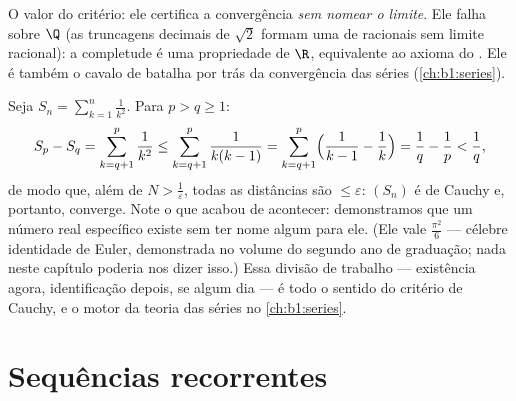 \begin{remark}
O valor do critério: ele certifica a convergência \emph{sem
nomear o limite}. Ele falha sobre $\Q$ (as truncagens decimais de
$\sqrt 2$ formam uma  de racionais sem limite
racional): a completude é uma propriedade de $\R$, equivalente ao
axioma do . Ele é também o cavalo de batalha por trás da
convergência das séries (\cref{ch:b1:series}).
\end{remark}

\begin{example}\label{ex:b1:seq:basel}
Seja $S_n = \sum_{k=1}^{n} \frac{1}{k^2}$. Para $p > q \geq 1$:
\[
S_p - S_q = \sum_{k=q+1}^{p} \frac{1}{k^2}
\leq \sum_{k=q+1}^{p} \frac{1}{k(k-1)}
= \sum_{k=q+1}^{p} \Bigl(\frac{1}{k-1} - \frac 1k\Bigr)
= \frac 1q - \frac 1p < \frac 1q ,
\]
de modo que, além de $N > \frac1\varepsilon$, todas as distâncias são $\leq \varepsilon$:
$(S_n)$ é de Cauchy e, portanto, converge. Note o que acabou de
acontecer: demonstramos que um número real específico existe sem ter
nome algum para ele. (Ele vale $\frac{\pi^2}{6}$ --- célebre identidade de
Euler, demonstrada no volume do segundo ano de graduação; nada neste
capítulo poderia nos dizer isso.) Essa divisão de trabalho --- existência
agora, identificação depois, se algum dia --- é todo o sentido do
critério de Cauchy, e o motor da teoria das séries no
\cref{ch:b1:series}.
\end{example}

\section{Sequências recorrentes}

